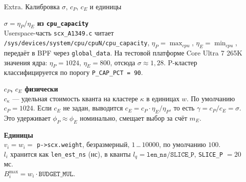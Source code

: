 \documentclass[aspectratio=169,11pt]{beamer}
\begin{document}
\begin{frame}{Extra. Калибровка $\sigma$, $c_P$, $c_E$ и единицы}
        \scriptsize
        \begin{shadowbox}
                \textbf{$\sigma = \eta_P / \eta_E$ из \texttt{cpu\_capacity}}\\
                Userspace-часть \texttt{scx\_A1349.c} читает
                \texttt{/sys/devices/system/cpu/cpuN/cpu\_capacity},
                $\eta_P = \max_{cpu}$, $\eta_E = \min_{cpu}$, передаёт
                в BPF через \texttt{global\_data}. На тестовой
                платформе Core Ultra 7 265K значения ядра:
                $\eta_P = 1024$, $\eta_E = 800$, отсюда
                $\sigma \approx 1{,}28$. P-кластер классифицируется
                по порогу \texttt{P\_CAP\_PCT = 90}.
        \end{shadowbox}

        \vspace{0.1cm}
        \begin{shadowbox2}
                \textbf{$c_P$, $c_E$ физически}\\
                $c_\kappa$ — удельная стоимость кванта на кластере
                $\kappa$ в единицах $w$. По умолчанию $c_P = 1024$.
                Если $c_E$ не задан, выводится $c_E = c_P \cdot
                \eta_E / \eta_P$, то есть $\gamma = c_P/c_E = \sigma$.
                Это удерживает $\phi_P \approx \phi_E$ номинально,
                смещает выбор за счёт $m_E$.
        \end{shadowbox2}

        \vspace{0.1cm}
        \begin{shadowbox}
                \textbf{Единицы}\\
                $v_i = w_i = $ \texttt{p->scx.weight}, безразмерный,
                $1$\,\ldots\,$10000$, по умолчанию $100$.\\
                $l_i$ хранится как \texttt{len\_est\_ns} (нс),
                в кванты $l_q = \texttt{len\_ns} / \texttt{SLICE\_P}$,
                \texttt{SLICE\_P} $= 20$\,мс.\\
                $B_i^{\max} = w_i \cdot \texttt{BUDGET\_MUL}$.
        \end{shadowbox}
\end{frame}
\addtocounter{framenumber}{-1}
\end{document}
